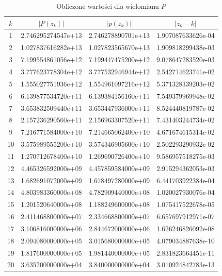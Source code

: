 \documentclass[11pt]{mk-polish-lab-report}
\begin{document}
\begin{table}[h]
        \centering
        \footnotesize
\begin{tabular}{c
		|S[
        table-number-alignment = right,
		table-figures-integer  = 1,
		table-figures-decimal = 12,
		table-figures-exponent=2
		]
		|S[
        table-number-alignment = right,
		table-figures-integer  = 1,
		table-figures-decimal = 12,
		table-figures-exponent=2
		]
		|S[
        table-number-alignment = right,
		table-figures-integer  = 1,
		table-figures-decimal = 12,
		table-figures-exponent=2
		]}
{$k$} & {$|P(z_k)|$} & {$|p(z_k)|$} & {$|z_k-k|$} \\  & 2.746295274547e+13 & 2.746278890701e+13 & 1.907087633626e-04 \\
2 & 1.027837616282e+13 & 1.027823565670e+13 & 1.909818299438e-03 \\
3 & 7.199554861056e+12 & 7.199447475200e+12 & 9.078647283520e-03 \\
4 & 3.777623778304e+12 & 3.777532946944e+12 & 2.542714623741e-02 \\
5 & 1.555027751936e+12 & 1.554961097216e+12 & 5.371328339203e-02 \\
6 & 6.139877534720e+11 & 6.139384156160e+11 & 7.549379969948e-02 \\
7 & 3.653832509440e+11 & 3.653447936000e+11 & 8.524440819787e-02 \\
8 & 2.157236290560e+11 & 2.156963307520e+11 & 7.431403244734e-02 \\
9 & 7.216771584000e+10 & 7.214665062400e+10 & 4.671674615314e-02 \\
10 & 3.575989555200e+10 & 3.574346905600e+10 & 2.502293290932e-02 \\
11 & 1.270712678400e+10 & 1.269690726400e+10 & 9.586957518275e-03 \\
12 & 4.465326592000e+09 & 4.457859584000e+09 & 2.915294362053e-03 \\
13 & 1.682691072000e+09 & 1.678497280000e+09 & 6.441703922384e-04 \\
14 & 4.803983360000e+08 & 4.782909440000e+08 & 1.020027930076e-04 \\
15 & 1.201520640000e+08 & 1.188249600000e+08 & 1.075417522678e-05 \\
16 & 2.411468800000e+07 & 2.334668800000e+07 & 6.657697912971e-07 \\
17 & 3.106816000000e+06 & 2.844672000000e+06 & 1.626246826092e-08 \\
18 & 2.094080000000e+05 & 3.015680000000e+05 & 4.079034887638e-10 \\
19 & 1.817600000000e+05 & 1.981440000000e+05 & 2.831823664451e-11 \\
20 & 3.635200000000e+04 & 3.840000000000e+04 & 3.010924842783e-13 \\
\end{tabular}
\caption{Obliczone wartości dla wielomianu $P$}
\label{table:4}
\end{table}
\end{document}

